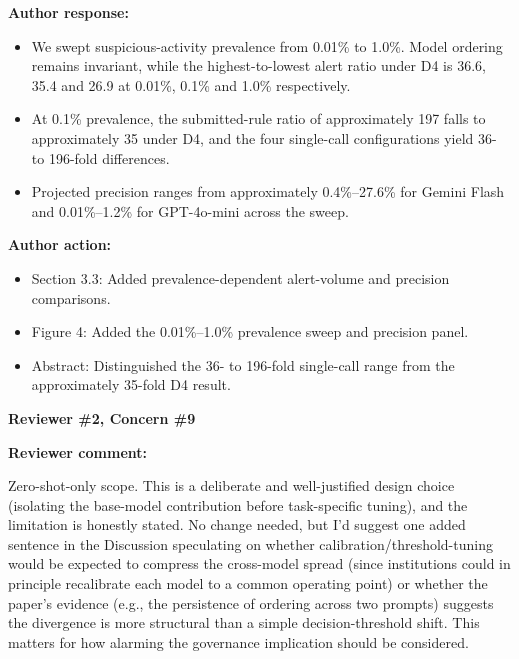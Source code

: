 \documentclass[11pt]{article}
\newcommand{\rvcomment}[1]{{\color{ReviewerGreen}#1}}
\newcommand{\concern}[1]{\textbf{\color{ReviewerGreen}#1}}
\begin{document}
\textbf{Author response:}

\begin{itemize}

\item We swept suspicious-activity prevalence from 0.01\% to 1.0\%. Model ordering remains invariant, while the highest-to-lowest alert ratio under D4 is 36.6, 35.4 and 26.9 at 0.01\%, 0.1\% and 1.0\% respectively.

\item At 0.1\% prevalence, the submitted-rule ratio of approximately 197 falls to approximately 35 under D4, and the four single-call configurations yield 36- to 196-fold differences.

\item Projected precision ranges from approximately 0.4\%--27.6\% for Gemini Flash and 0.01\%--1.2\% for GPT-4o-mini across the sweep.

\end{itemize}

\textbf{Author action:}

\begin{itemize}

\item Section 3.3: Added prevalence-dependent alert-volume and precision comparisons.

\item Figure 4: Added the 0.01\%--1.0\% prevalence sweep and precision panel.

\item Abstract: Distinguished the 36- to 196-fold single-call range from the approximately 35-fold D4 result.

\end{itemize}

\vspace{12pt}
\concern{Reviewer \#2, Concern \#9}

\concern{Reviewer comment:}

\rvcomment{Zero-shot-only scope. This is a deliberate and well-justified design choice (isolating the base-model contribution before task-specific tuning), and the limitation is honestly stated. No change needed, but I'd suggest one added sentence in the Discussion speculating on whether calibration/threshold-tuning would be expected to compress the cross-model spread (since institutions could in principle recalibrate each model to a common operating point) or whether the paper's evidence (e.g., the persistence of ordering across two prompts) suggests the divergence is more structural than a simple decision-threshold shift. This matters for how alarming the governance implication should be considered.}
\end{document}
